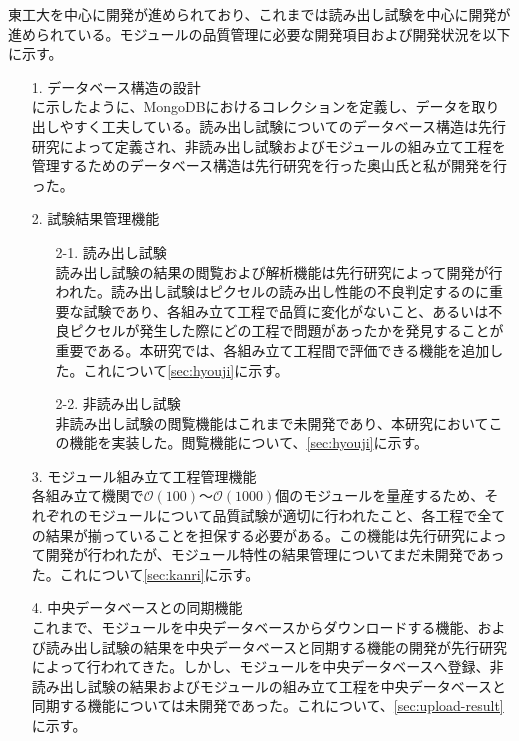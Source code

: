 東工大を中心に開発が進められており、これまでは読み出し試験を中心に開発が進められている。モジュールの品質管理に必要な開発項目および開発状況を以下に示す。
\begin{itemize}
  \item[1.] データベース構造の設計 \\
  に示したように、MongoDBにおけるコレクションを定義し、データを取り出しやすく工夫している。読み出し試験についてのデータベース構造は先行研究\cite{kubotan,kimu}によって定義され、非読み出し試験およびモジュールの組み立て工程を管理するためのデータベース構造は先行研究\cite{oku}を行った奥山氏と私が開発を行った。
  \item[2.] 試験結果管理機能
  \begin{itemize}
    \item[2-1.] 読み出し試験 \\
    読み出し試験の結果の閲覧および解析機能は先行研究\cite{oku,kubotan}によって開発が行われた。読み出し試験はピクセルの読み出し性能の不良判定するのに重要な試験であり、各組み立て工程で品質に変化がないこと、あるいは不良ピクセルが発生した際にどの工程で問題があったかを発見することが重要である。本研究では、各組み立て工程間で評価できる機能を追加した。これについて\ref{sec:hyouji}に示す。
    \item[2-2.] 非読み出し試験 \\
    非読み出し試験の閲覧機能はこれまで未開発であり、本研究においてこの機能を実装した。閲覧機能について、\ref{sec:hyouji}に示す。
  \end{itemize}
  \item[3.] モジュール組み立て工程管理機能 \\
  各組み立て機関で$\mathcal{O}(100)$〜$\mathcal{O}(1000)$個のモジュールを量産するため、それぞれのモジュールについて品質試験が適切に行われたこと、各工程で全ての結果が揃っていることを担保する必要がある。この機能は先行研究\cite{oku}によって開発が行われたが、モジュール特性の結果管理についてまだ未開発であった。これについて\ref{sec:kanri}に示す。
  \item[4.] 中央データベースとの同期機能 \\
  これまで、モジュールを中央データベースからダウンロードする機能、および読み出し試験の結果を中央データベースと同期する機能の開発が先行研究\cite{oku}によって行われてきた。しかし、モジュールを中央データベースへ登録、非読み出し試験の結果およびモジュールの組み立て工程を中央データベースと同期する機能については未開発であった。これについて、\ref{sec:upload-result}に示す。
\end{itemize}






\newpage
